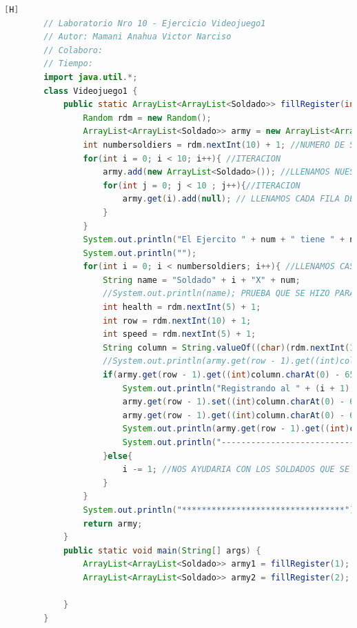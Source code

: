 \documentclass{article}
\begin{document}
	\begin{lstlisting}[language=java,caption={Las lineas de codigos del metodo creado:}][H]
		// Laboratorio Nro 10 - Ejercicio Videojuego1
		// Autor: Mamani Anahua Victor Narciso
		// Colaboro:
		// Tiempo:
		import java.util.*;
		class Videojuego1 {
			public static ArrayList<ArrayList<Soldado>> fillRegister(int num){
				Random rdm = new Random();
				ArrayList<ArrayList<Soldado>> army = new ArrayList<ArrayList<Soldado>>();
				int numbersoldiers = rdm.nextInt(10) + 1; //NUMERO DE SOLDADOS ALEATORIOS ENTRE 1 A 10 SOLDADOS 
				for(int i = 0; i < 10; i++){ //ITERACION
					army.add(new ArrayList<Soldado>()); //LLENAMOS NUESTROS ARRAYLIST BIDIMENSIONAL CON CADA FILA PARA QUE CUMPLAN CON ESTRUCTURA DEL TABLERO
					for(int j = 0; j < 10 ; j++){//ITERACION
						army.get(i).add(null); // LLENAMOS CADA FILA DEL ARRAYLIST CON UN OBJETO SOLDADO CON TAL QUE ESTE SEA NULL PARA QUE SEPA QUE ESTE TIENE UNA CASILLA PERO NO HAY NADIE TODAVIA SE PUEDE LLENAR 
					}
				}
				System.out.println("El Ejercito " + num + " tiene " + numbersoldiers + " soldados : " ); 
				System.out.println("");
				for(int i = 0; i < numbersoldiers; i++){ //LLENAMOS CASILLAS CON CADA SOLDADO CREADO ALEATORIAMENTE
					String name = "Soldado" + i + "X" + num;
					//System.out.println(name); PRUEBA QUE SE HIZO PARA VER LOS NOMBRES
					int health = rdm.nextInt(5) + 1;
					int row = rdm.nextInt(10) + 1;
					int speed = rdm.nextInt(5) + 1;
					String column = String.valueOf((char)(rdm.nextInt(10) + 65)); //REUTILIZAMOS CODIGO DEL ANTERIOR ARCHIVO VIDEOJUEGO2.JAVA YA QUE TENDRIAN LA MISMA FUNCIONALIDAD
					//System.out.println(army.get(row - 1).get((int)column.charAt(0) - 65)); PRUEBA QUE SE HIZO PARA COMPROBAR SI EL OBJETO SE ESTABA DANDO O NO CAPAZ NI EXISTIA  
					if(army.get(row - 1).get((int)column.charAt(0) - 65) == null){
						System.out.println("Registrando al " + (i + 1) + " soldado del Ejercito " + num + "");
						army.get(row - 1).set((int)column.charAt(0) - 65, new Soldado(name, health, row, column));
						army.get(row - 1).get((int)column.charAt(0) - 65).setSpeed(speed);
						System.out.println(army.get(row - 1).get((int)column.charAt(0) - 65).toString());
						System.out.println("---------------------------------");
					}else{
						i -= 1; //NOS AYUDARIA CON LOS SOLDADOS QUE SE REPITEN EN EL MISMO CASILLERO CON TAL QUE NO DEBERIA CONTAR 
					}
				}
				System.out.println("*********************************");
				return army;
			}   
			public static void main(String[] args) {
				ArrayList<ArrayList<Soldado>> army1 = fillRegister(1);
				ArrayList<ArrayList<Soldado>> army2 = fillRegister(2);
		
			}
		}
	\end{lstlisting}
\end{document}
